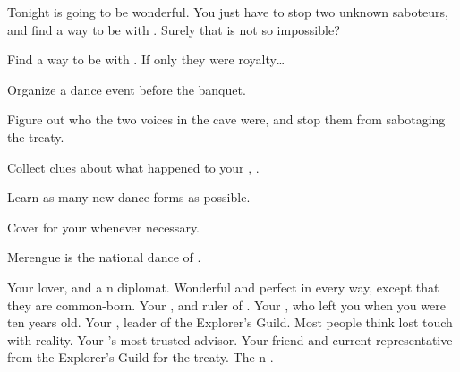 \documentclass[char]{NeptuneBall}
\begin{document}
Tonight is going to be wonderful. You just have to stop two unknown saboteurs, and find a way to be with \cDiplomat{}. Surely that is not so impossible?

\begin{itemz}[Goals]
  \item Find a way to be with \cDiplomat{}. If only they were royalty\ldots
  \item Organize a dance event before the banquet.
  \item Figure out who the two voices in the cave were, and stop them from sabotaging the treaty.
  \item Collect clues about what happened to your \cQueen{\parent}, \cQueen{\King} \cQueen{}.
  \item Learn as many new dance forms as possible.
  \item Cover for your \cKing{\parent} whenever necessary.
\end{itemz}

\begin{itemz}[Trivia]
  \item Merengue is the national dance of \pAtlantis{}.
\end{itemz}

\begin{contacts}
  \contact{\cDiplomat{}} Your lover, and a \pPacifica{}n diplomat. Wonderful and perfect in every way, except that they are common-born.
  \contact{\cKing{}} Your \cKing{\parent}, and ruler of \pAtlantis{}.
  \contact{\cAriel{}} Your \cAriel{\sibling}, who left you when you were ten years old.
  \contact{\cPlant{}} Your \cPlant{\uncle}, leader of the Explorer's Guild. Most people think \cPlant{\they} \cPlant{\have} lost touch with reality.
  \contact{\cManta{}} Your \cKing{\parent}'s most trusted advisor.
  \contact{\cPriest{}} Your friend and current representative from the Explorer's Guild for the treaty.
  \contact{\cPrince{}} The \pPacifica{}n \cPrince{\prince}.
\end{contacts}
\end{document}
